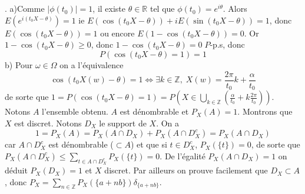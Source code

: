 \documentclass{report}
\begin{document}
\subsection{} \noindent{}\\ 
\\ 
\\
. a)Comme $|\phi(t_0)|=1$, il existe $\theta \in \mathbb R$ tel que $\phi(t_0)=e^{i\theta}$. Alors $E(e^{i(t_0X-\theta)})=1$ ie $E(\cos(t_0X-\theta))+iE(\sin(t_0X-\theta))=1$, donc $E(\cos(t_0X-\theta))=1$ ou encore $E(1-\cos(t_0X-\theta))=0$. \newline
Or $1-\cos(t_0X-\theta)\geq 0$, donc $1-\cos(t_0X-\theta)=0\; P$-p.s, donc $$P(\cos(t_0X-\theta)=1)=1$$
b) Pour $\omega \in \Omega$ on a l'équivalence $$\cos(t_0X(w)-\theta)=1 \iff \exists k \in \mathbb Z, \; X(w) = \frac{2\pi}{t_0}k + \frac{\alpha}{t_0}$$
de sorte que $1=P(\cos(t_0X-\theta)=1)=P(X\in \bigcup_{k\in \mathbb Z} \left( \frac{\alpha}{t_0} +k \frac{2\pi}{t_0}\right))$.\newline
Notons $A$ l'ensemble obtenu. $A$ est dénombrable et $P_X(A)=1$. Montrons que $X$ est discret. Notons $D_X$ le support de $X$. On a $$1=P_X(A)=P_X(A\cap D_X)+P_X(A\cap D^c_X)=P_X(A\cap D_X)$$ car $A\cap D_X^c$ est dénombrable ($\subset A$) et que si $t\in  D^c_X$, $P_X(\{t\})=0$, de sorte que $P_X(A\cap D^c_X)\leq \sum_{t\in A\cap D^c_X} P_X(\{t\}) = 0$.\newline
De l'égalité $P_X(A\cap D_X)=1$ on déduit $P_X(D_X)=1$ et $X$ discret. \newline
Par ailleurs on prouve facilement que $D_X\subset A$, donc \newline $P_X=\sum_{n\in \mathbb Z} P_X(\{a+nb\}) \delta_{\{a+nb\}}$.  \newline
\end{document}
